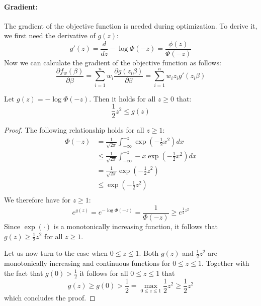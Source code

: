 \paragraph{Gradient:}
The gradient of the objective function is needed during optimization.
To derive it, we first need the derivative of $g(z)$:
\begin{equation*}
    g'(z) = \frac{d}{dz} - \log \Phi(-z) = \frac{\phi(z)}{\Phi(-z)}
\end{equation*}
Now we can calculate the gradient of the objective function as follows:
\begin{equation*}
    \frac{\partial f_w(\beta)}{\partial \beta} =
    \sum_{i=1}^n w_i \frac{\partial g(z_i \beta)}{\partial \beta} =
    \sum_{i=1}^n w_i z_i g'(z_i \beta)
\end{equation*}

\begin{lemma}
    Let $g(z) = -\log \Phi(-z)$. Then it holds for all $z \geq 0$ that:
    $$
        \frac{1}{2} z^2 \leq g(z)
    $$
\end{lemma}
\begin{proof}
    The following relationship holds for all $z \geq 1$:
    \begin{align*}
        \Phi(-z) & = \frac{1}{\sqrt{2 \pi}} \int_{-\infty}^{-z} \exp{ \left(-\frac{1}{2} x^2 \right)} dx       \\
                 & \leq \frac{1}{\sqrt{2 \pi}} \int_{-\infty}^{-z} -x \exp{ \left(-\frac{1}{2} x^2 \right)} dx \\
                 & = \frac{1}{\sqrt{2 \pi}} \exp{\left( -\frac{1}{2} z^2 \right)}                              \\
                 & \leq \exp{\left( -\frac{1}{2} z^2 \right)}                                                  \\
    \end{align*}
    We therefore have for $z \geq 1$:
    $$
        e^{g(z)} = e^{-\log \Phi(-z)} = \frac{1}{\Phi(-z)} \geq e^{\frac{1}{2} z^2}
    $$
    Since $\exp( \cdot )$ is a monotonically increasing function,
    it follows that $g(z) \geq \frac{1}{2}z^2$ for all $z \geq 1$.

    \noindent{}Let us now turn to the case when $0 \leq z \leq 1$.
    Both $g(z)$ and $\frac{1}{2}z^2$ are monotonically increasing
    and continuous functions for $0 \leq z \leq 1$.
    Together with the fact that $g(0) > \frac{1}{2}$ it follows
    for all $0 \leq z \leq 1$ that
    $$
        g(z) \geq g(0) > \frac{1}{2} = \max_{0 \leq z \leq 1} \frac{1}{2} z^2 \geq \frac{1}{2} z^2
    $$
    which concludes the proof.
\end{proof}

